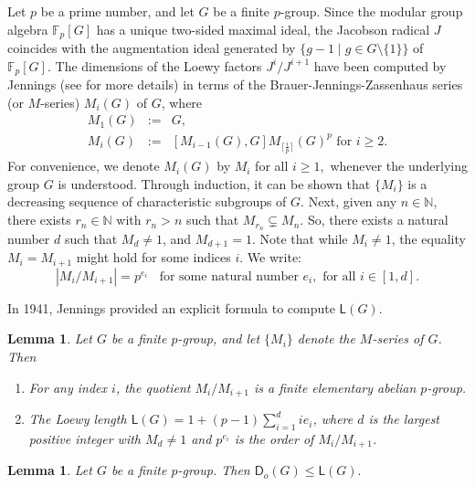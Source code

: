 \documentclass[a4paper,11pt]{article}
\numberwithin{equation}{section}
\newtheorem{lem}[thm]{Lemma}
\newcommand{\no}{\noindent}
\begin{document}
\no Let $p$ be a prime number, and let $G$ be a finite $p$-group. Since the modular group algebra $\mathbb{F}_p[G]$ has a unique two-sided maximal ideal, the Jacobson radical $J$ coincides with the augmentation ideal generated by $\{g-1 \mid g \in G \setminus \{1\}\}$ of $\mathbb{F}_p[G].$
 The dimensions of the Loewy factors $J^i/J^{i+1}$ have been computed by Jennings (see \cite{J} for more details) in terms of the Brauer-Jennings-Zassenhaus series (or $M$-series) $M_i(G)$ of $G$, where
\begin{eqnarray*}
    M_{1}(G) & := & G,\\
    M_{i}(G) & := & [M_{i-1}(G), G]M_{\lceil \frac{i}{p} \rceil}(G)^{p} \text{ for }i \geq 2.
\end{eqnarray*}
\noindent For convenience, we denote $M_i(G)$ by $M_i$ for all $i \ge 1,$ whenever the underlying group $G$ is understood. Through induction, it can be shown that $\{M_i\}$ is a decreasing sequence of characteristic subgroups of $G$. Next, given any $n \in \mathbb{N}$, there exists $r_n \in \mathbb{N}$ with $r_n > n$ such that $M_{r_n} \subsetneq M_n$. So, there exists a natural number $d$ such that $M_{d}\neq 1$, and $M_{d+1}=1.$ Note that while $M_i\neq 1$, the equality $M_i = M_{i+1}$ might hold for some indices $i$. We write:
$$|M_i/M_{i+1}|=p^{e_i} \; \; \text{ for some natural number } e_i,  \text{ for all } i\in [1,d].$$

\no In 1941, Jennings provided an explicit formula to compute $\mathsf{L}(G)$.

\begin{lem}\emph{\cite{J}}\label{JenningsTheorem} Let $G$ be a finite $p$-group, and let $\{M_i\}$ denote the $M$-series of $G$. Then\begin{enumerate}[label=\emph{(\roman*)}]
        \item For any index $i$, the quotient $M_i/M_{i+1}$ is a finite elementary abelian $p$-group.
        \item  The Loewy length $\mathsf{L}(G)=1+(p-1)\sum_{i=1}^d ie_i$, where $d$ is the largest positive integer with $M_{d}\neq 1$ and $p^{e_i}$ is the order of $M_i/M_{i+1}$.
    \end{enumerate}
\end{lem}


\begin{lem}\emph{{\cite[Theorem 1, Corollary 1]{Dimitrov}}}\label{Dimitovtheorem}
Let $G$ be a finite $p$-group. Then $\mathsf{D}_o(G) \le \mathsf{L}(G).$
\end{lem}
\end{document}
